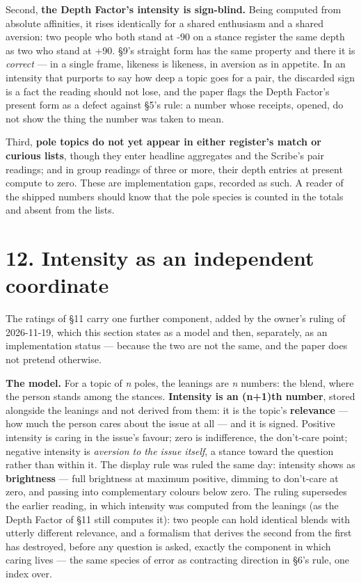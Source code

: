 Second, \textbf{the Depth Factor's intensity is sign-blind.} Being
computed from absolute affinities, it rises identically for a shared
enthusiasm and a shared aversion: two people who both stand at -90 on a
stance register the same depth as two who stand at +90. \S 9's straight
form has the same property and there it is \emph{correct} --- in a
single frame, likeness is likeness, in aversion as in appetite. In an
intensity that purports to say how deep a topic goes for a pair, the
discarded sign is a fact the reading should not lose, and the paper
flags the Depth Factor's present form as a defect against \S 5's rule: a
number whose receipts, opened, do not show the thing the number was
taken to mean.

Third, \textbf{pole topics do not yet appear in either register's match
or curious lists}, though they enter headline aggregates and the
Scribe's pair readings; and in group readings of three or more, their
depth entries at present compute to zero. These are implementation gaps,
recorded as such. A reader of the shipped numbers should know that the
pole species is counted in the totals and absent from the lists.

\section{12. Intensity as an independent
coordinate}\label{intensity-as-an-independent-coordinate}

The ratings of \S 11 carry one further component, added by the owner's
ruling of 2026-11-19, which this section states as a model and then,
separately, as an implementation status --- because the two are not the
same, and the paper does not pretend otherwise.

\textbf{The model.} For a topic of \emph{n} poles, the leanings are
\emph{n} numbers: the blend, where the person stands among the stances.
\textbf{Intensity is an (n+1)th number}, stored alongside the leanings
and not derived from them: it is the topic's \textbf{relevance} --- how
much the person cares about the issue at all --- and it is signed.
Positive intensity is caring in the issue's favour; zero is
indifference, the don't-care point; negative intensity is \emph{aversion
to the issue itself}, a stance toward the question rather than within
it. The display rule was ruled the same day: intensity shows as
\textbf{brightness} --- full brightness at maximum positive, dimming to
don't-care at zero, and passing into complementary colours below zero.
The ruling supersedes the earlier reading, in which intensity was
computed from the leanings (as the Depth Factor of \S 11 still computes
it): two people can hold identical blends with utterly different
relevance, and a formalism that derives the second from the first has
destroyed, before any question is asked, exactly the component in which
caring lives --- the same species of error as contracting direction in
\S 6's rule, one index over.

